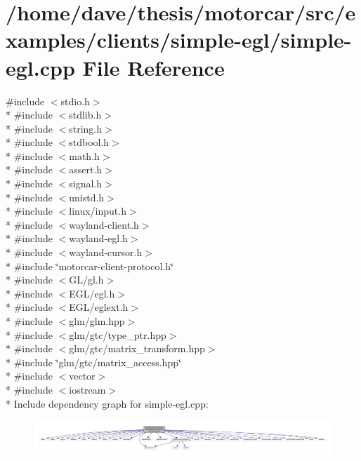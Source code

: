 \hypertarget{simple-egl_8cpp}{\section{/home/dave/thesis/motorcar/src/examples/clients/simple-\/egl/simple-\/egl.cpp File Reference}
\label{simple-egl_8cpp}
}
{\ttfamily \#include $<$stdio.\-h$>$}\\*
{\ttfamily \#include $<$stdlib.\-h$>$}\\*
{\ttfamily \#include $<$string.\-h$>$}\\*
{\ttfamily \#include $<$stdbool.\-h$>$}\\*
{\ttfamily \#include $<$math.\-h$>$}\\*
{\ttfamily \#include $<$assert.\-h$>$}\\*
{\ttfamily \#include $<$signal.\-h$>$}\\*
{\ttfamily \#include $<$unistd.\-h$>$}\\*
{\ttfamily \#include $<$linux/input.\-h$>$}\\*
{\ttfamily \#include $<$wayland-\/client.\-h$>$}\\*
{\ttfamily \#include $<$wayland-\/egl.\-h$>$}\\*
{\ttfamily \#include $<$wayland-\/cursor.\-h$>$}\\*
{\ttfamily \#include \char`\"{}motorcar-\/client-\/protocol.\-h\char`\"{}}\\*
{\ttfamily \#include $<$G\-L/gl.\-h$>$}\\*
{\ttfamily \#include $<$E\-G\-L/egl.\-h$>$}\\*
{\ttfamily \#include $<$E\-G\-L/eglext.\-h$>$}\\*
{\ttfamily \#include $<$glm/glm.\-hpp$>$}\\*
{\ttfamily \#include $<$glm/gtc/type\-\_\-ptr.\-hpp$>$}\\*
{\ttfamily \#include $<$glm/gtc/matrix\-\_\-transform.\-hpp$>$}\\*
{\ttfamily \#include \char`\"{}glm/gtc/matrix\-\_\-access.\-hpp\char`\"{}}\\*
{\ttfamily \#include $<$vector$>$}\\*
{\ttfamily \#include $<$iostream$>$}\\*
Include dependency graph for simple-\/egl.cpp\-:
\nopagebreak
\begin{figure}[H]
\begin{center}
\leavevmode
\includegraphics[width=350pt]{simple-egl_8cpp__incl}
\end{center}
\end{figure}
